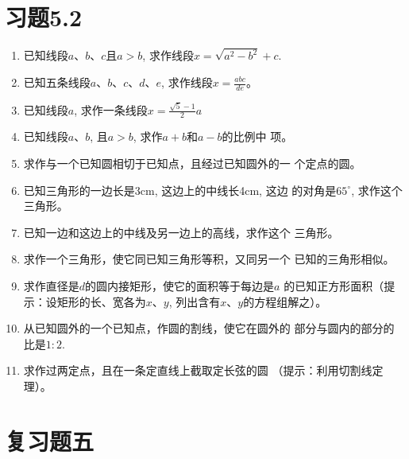 \section*{习题5.2}
\begin{enumerate}
    \item 已知线段$a$、$b$、$c$且$a>b$, 求作线段$x=\sqrt{a^2-b^2}+c$.
    \item 已知五条线段$a$、$b$、$c$、$d$、$e$, 求作线段$x=\frac{abc}{de}$。
    \item 已知线段$a$, 求作一条线段$x=\frac{\sqrt{5}-1}{2}a$
    \item 已知线段$a$、$b$, 且$a>b$, 求作$a+b$和$a-b$的比例中
    项。
    \item 求作与一个已知圆相切于已知点，且经过已知圆外的一
    个定点的圆。
    \item 已知三角形的一边长是3cm, 这边上的中线长4cm, 这边
    的对角是$65^{\circ}$, 求作这个三角形。
    \item 已知一边和这边上的中线及另一边上的高线，求作这个
    三角形。
    \item 求作一个三角形，使它同已知三角形等积，又同另一个
    已知的三角形相似。
    \item 求作直径是$d$的圆内接矩形，使它的面积等于每边是$a$
    的已知正方形面积（提示：设矩形的长、宽各为$x$、$y$,
    列出含有$x$、$y$的方程组解之）。
    \item 从已知圆外的一个已知点，作圆的割线，使它在圆外的
    部分与圆内的部分的比是$1:2$.
    \item 求作过两定点，且在一条定直线上截取定长弦的圆
    （提示：利用切割线定理）。
\end{enumerate}

\section*{复习题五}

